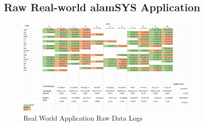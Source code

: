 \subsection{Raw Real-world alamSYS Application}
\label{subsec:rawalamSYSapp}

\begin{figure}[ht]
    \centering
    \includegraphics[width=0.80\textwidth]{./assets/Appendices/B/RawTestsData/RealWorldApplicationLog.png}
    \caption{Real World Application Raw Data Logs}
    \label{fig:RealWorldApplicationLog}
\end{figure}
\FloatBarrier

